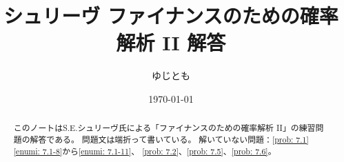 \documentclass[uplatex]{jsarticle}
\theoremstyle{definition}
\begin{document}
\title{シュリーヴ ファイナンスのための確率解析 II 解答}

\date{\today}
\author{ゆじとも}

\maketitle

\begin{abstract}
  このノートはS.E.シュリーヴ氏による「ファイナンスのための確率解析 II」の練習問題の解答である。
  問題文は端折って書いている。
  解いていない問題：\autoref{prob: 7.1} \ref{enumi: 7.1-8}から\ref{enumi: 7.1-11}、
  \autoref{prob: 7.2}、\autoref{prob: 7.5}、\autoref{prob: 7.6}。
\end{abstract}

\tableofcontents

\
\end{document}
